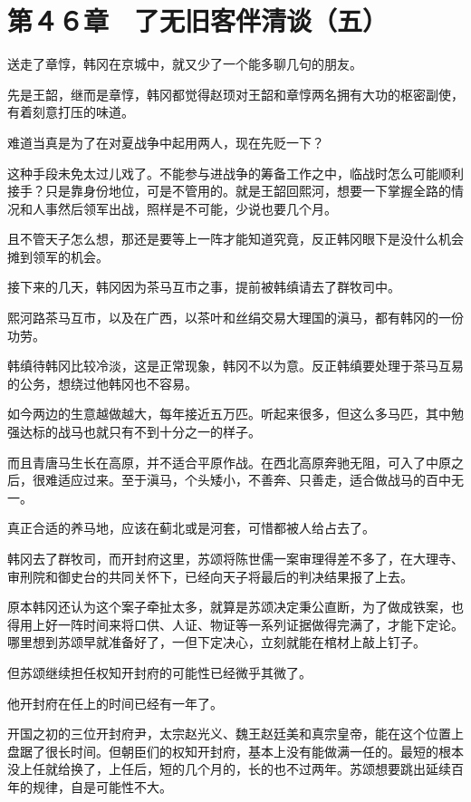 \section{第４６章　了无旧客伴清谈（五）}

送走了章惇，韩冈在京城中，就又少了一个能多聊几句的朋友。

先是王韶，继而是章惇，韩冈都觉得赵顼对王韶和章惇两名拥有大功的枢密副使，有着刻意打压的味道。

难道当真是为了在对夏战争中起用两人，现在先贬一下？

这种手段未免太过儿戏了。不能参与进战争的筹备工作之中，临战时怎么可能顺利接手？只是靠身份地位，可是不管用的。就是王韶回熙河，想要一下掌握全路的情况和人事然后领军出战，照样是不可能，少说也要几个月。

且不管天子怎么想，那还是要等上一阵才能知道究竟，反正韩冈眼下是没什么机会摊到领军的机会。

接下来的几天，韩冈因为茶马互市之事，提前被韩缜请去了群牧司中。

熙河路茶马互市，以及在广西，以茶叶和丝绢交易大理国的滇马，都有韩冈的一份功劳。

韩缜待韩冈比较冷淡，这是正常现象，韩冈不以为意。反正韩缜要处理于茶马互易的公务，想绕过他韩冈也不容易。

如今两边的生意越做越大，每年接近五万匹。听起来很多，但这么多马匹，其中勉强达标的战马也就只有不到十分之一的样子。

而且青唐马生长在高原，并不适合平原作战。在西北高原奔驰无阻，可入了中原之后，很难适应过来。至于滇马，个头矮小，不善奔、只善走，适合做战马的百中无一。

真正合适的养马地，应该在蓟北或是河套，可惜都被人给占去了。

韩冈去了群牧司，而开封府这里，苏颂将陈世儒一案审理得差不多了，在大理寺、审刑院和御史台的共同关怀下，已经向天子将最后的判决结果报了上去。

原本韩冈还认为这个案子牵扯太多，就算是苏颂决定秉公直断，为了做成铁案，也得用上好一阵时间来将口供、人证、物证等一系列证据做得完满了，才能下定论。哪里想到苏颂早就准备好了，一但下定决心，立刻就能在棺材上敲上钉子。

但苏颂继续担任权知开封府的可能性已经微乎其微了。

他开封府在任上的时间已经有一年了。

开国之初的三位开封府尹，太宗赵光义、魏王赵廷美和真宗皇帝，能在这个位置上盘踞了很长时间。但朝臣们的权知开封府，基本上没有能做满一任的。最短的根本没上任就给换了，上任后，短的几个月的，长的也不过两年。苏颂想要跳出延续百年的规律，自是可能性不大。

